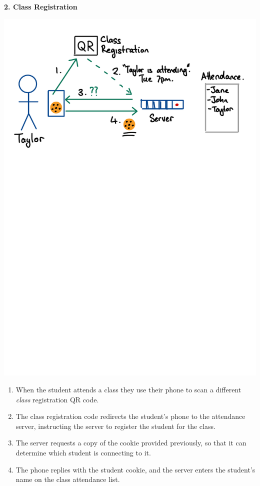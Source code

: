 \hspace{2em}
\begin{minipage}[t]{\dimexpr0.5\linewidth-1em}
\textbf{2. Class Registration}
\begin{center}
\includegraphics[scale=0.4]{figure/fig-class-registration.pdf}

\begin{enumerate}
\item When the student attends a class they use their phone to scan
      a different \emph{class} registration QR code.
\item The class registration code redirects the student's phone to the
      attendance server, instructing the server to register the student
      for the class.
\item The server requests a copy of the cookie provided previously,
      so that it can determine which student is connecting to it.
\item The phone replies with the student cookie, and the server
      enters the student's name on the class attendance list.
\end{enumerate}
\end{center}



\end{minipage}
